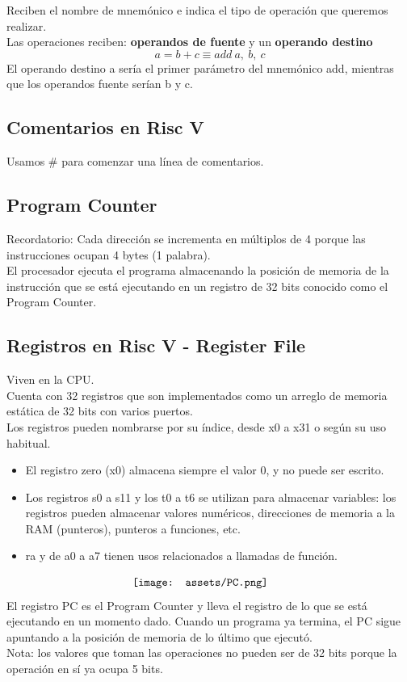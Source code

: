 \documentclass[10pt,a4paper]{article}
\begin{document}
Reciben el nombre de mnemónico e indica el tipo de operación que queremos realizar. \\
Las operaciones reciben: \textbf{operandos de fuente} y un \textbf{operando destino}
\[a = b + c \equiv add \ a,\ b,\ c\]
El operando destino a sería el primer parámetro del mnemónico add, mientras que los operandos fuente serían b y c.
\subsection*{Comentarios en Risc V}
Usamos \# para comenzar una línea de comentarios.
\subsection*{Program Counter}
Recordatorio: Cada dirección se incrementa en múltiplos de 4 porque las instrucciones ocupan 4 bytes (1 palabra). \\
El procesador ejecuta el programa almacenando la posición de memoria de la instrucción que se está ejecutando en un registro de 32 bits conocido como el Program Counter. 
\subsection*{Registros en Risc V - Register File}
Viven en la CPU. \\ 
Cuenta con 32 registros que son implementados como un arreglo de memoria estática de 32 bits con varios puertos. \\
Los registros pueden nombrarse por su índice, desde x0 a x31 o según su uso habitual.
\begin{itemize}
    \item El registro zero (x0) almacena siempre el valor 0, y no puede ser escrito.
    \item Los registros s0 a s11 y los t0 a t6 se utilizan para almacenar variables: los registros pueden almacenar valores numéricos, direcciones de memoria a la RAM (punteros), punteros a funciones, etc.
    \item ra y de a0 a a7 tienen usos relacionados a llamadas de función.
\end{itemize}
\[\begin{minipage}[b]{0.4\textwidth}
    \texttt{[image: assets/PC.png]}
    \label{fig:PC}
\end{minipage}\]
El registro PC es el Program Counter y lleva el registro de lo que se está ejecutando en un momento dado. Cuando un programa ya termina, el PC sigue apuntando a la posición de memoria de lo último que ejecutó. \\
Nota: los valores que toman las operaciones no pueden ser de 32 bits porque la operación en sí ya ocupa 5 bits. \\
\end{document}
